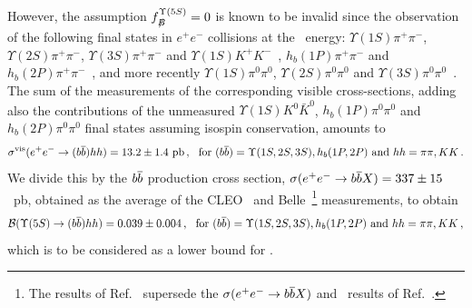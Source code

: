 However, the assumption $f^{\Upsilon(5S)}_{B\!\!\!\!/}=0$ is known to be invalid since the observation of
the following final states in $e^+e^-$ collisions at the \Upsfive\ energy:
$\Upsilon(1S)\pi^+\pi^-$,
$\Upsilon(2S)\pi^+\pi^-$,
$\Upsilon(3S)\pi^+\pi^-$
and
$\Upsilon(1S)K^+K^-$~\cite{Abe:2007tk,Garmash:2014dhx_mod},
$h_b(1P)\pi^+\pi^-$ and 
$h_b(2P)\pi^+\pi^-$~\cite{Adachi:2011ji},
and more recently 
$\Upsilon(1S)\pi^0\pi^0$,
$\Upsilon(2S)\pi^0\pi^0$ 
and
$\Upsilon(3S)\pi^0\pi^0$~\cite{Krokovny:2013mgx}.
The sum of the measurements of the corresponding visible cross-sections,
adding also the contributions of the unmeasured
$\Upsilon(1S)K^0\bar{K}^0$, $h_b(1P)\pi^0\pi^0$ and $h_b(2P)\pi^0\pi^0$ final states
assuming isospin conservation, amounts to
$$
\sigma^{\rm vis}(e^+e^-\to (\b\bar{\b})hh) = 13.2\pm1.4~{\rm pb} \,,
~~\mbox{for $(\b\bar{\b})=\Upsilon(1S,2S,3S),h_b(1P,2P)$ and $hh=\pi\pi,KK$}\,.
$$
We divide this by the $\b\bar{\b}$ production cross section, 
$\sigma(e^+e^- \to \b\bar{\b} X) = 337 \pm 15$~pb, obtained as the average of the 
CLEO~\cite{Artuso:2005xw} and Belle~\cite{Esen:2012yz}\footnote{
  \label{foot:life_mix:Esen:2012yz}
  The results of Ref.~\cite{Esen:2012yz} supersede the $\sigma(e^+e^- \to \b\bar{\b} X)$ and \fsfive\ results of Ref.~\cite{Drutskoy:2006fg}.
} measurements, to obtain
$$
{\cal B}(\Upsfive\to (\b\bar{\b})hh) = 0.039\pm0.004 \,,
~~\mbox{for $(\b\bar{\b})=\Upsilon(1S,2S,3S),h_b(1P,2P)$ and $hh=\pi\pi,KK$}\,,
$$
which is to be considered as a lower bound for \fnBfive. 


